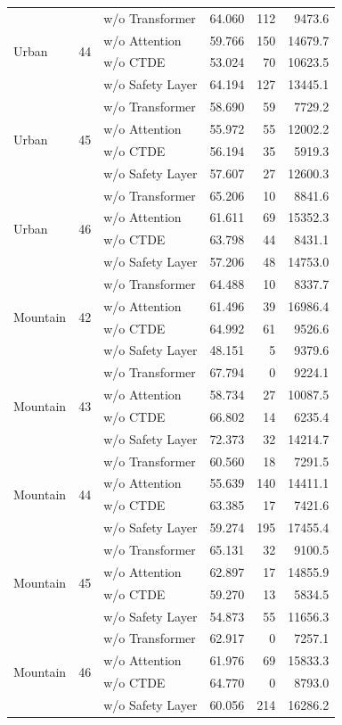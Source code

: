 \begin{longtable}{lllrrr}
\midrule
\multirow{4}{*}{Urban} & \multirow{4}{*}{44} & w/o Transformer & 64.060 & 112 & 9473.6 \\
 &  & w/o Attention & 59.766 & 150 & 14679.7 \\
 &  & w/o CTDE & 53.024 & 70 & 10623.5 \\
 &  & w/o Safety Layer & 64.194 & 127 & 13445.1 \\
\midrule
\multirow{4}{*}{Urban} & \multirow{4}{*}{45} & w/o Transformer & 58.690 & 59 & 7729.2 \\
 &  & w/o Attention & 55.972 & 55 & 12002.2 \\
 &  & w/o CTDE & 56.194 & 35 & 5919.3 \\
 &  & w/o Safety Layer & 57.607 & 27 & 12600.3 \\
\midrule
\multirow{4}{*}{Urban} & \multirow{4}{*}{46} & w/o Transformer & 65.206 & 10 & 8841.6 \\
 &  & w/o Attention & 61.611 & 69 & 15352.3 \\
 &  & w/o CTDE & 63.798 & 44 & 8431.1 \\
 &  & w/o Safety Layer & 57.206 & 48 & 14753.0 \\
\midrule
\multirow{4}{*}{Mountain} & \multirow{4}{*}{42} & w/o Transformer & 64.488 & 10 & 8337.7 \\
 &  & w/o Attention & 61.496 & 39 & 16986.4 \\
 &  & w/o CTDE & 64.992 & 61 & 9526.6 \\
 &  & w/o Safety Layer & 48.151 & 5 & 9379.6 \\
\midrule
\multirow{4}{*}{Mountain} & \multirow{4}{*}{43} & w/o Transformer & 67.794 & 0 & 9224.1 \\
 &  & w/o Attention & 58.734 & 27 & 10087.5 \\
 &  & w/o CTDE & 66.802 & 14 & 6235.4 \\
 &  & w/o Safety Layer & 72.373 & 32 & 14214.7 \\
\midrule
\multirow{4}{*}{Mountain} & \multirow{4}{*}{44} & w/o Transformer & 60.560 & 18 & 7291.5 \\
 &  & w/o Attention & 55.639 & 140 & 14411.1 \\
 &  & w/o CTDE & 63.385 & 17 & 7421.6 \\
 &  & w/o Safety Layer & 59.274 & 195 & 17455.4 \\
\midrule
\multirow{4}{*}{Mountain} & \multirow{4}{*}{45} & w/o Transformer & 65.131 & 32 & 9100.5 \\
 &  & w/o Attention & 62.897 & 17 & 14855.9 \\
 &  & w/o CTDE & 59.270 & 13 & 5834.5 \\
 &  & w/o Safety Layer & 54.873 & 55 & 11656.3 \\
\midrule
\multirow{4}{*}{Mountain} & \multirow{4}{*}{46} & w/o Transformer & 62.917 & 0 & 7257.1 \\
 &  & w/o Attention & 61.976 & 69 & 15833.3 \\
 &  & w/o CTDE & 64.770 & 0 & 8793.0 \\
 &  & w/o Safety Layer & 60.056 & 214 & 16286.2 \\
\end{longtable}